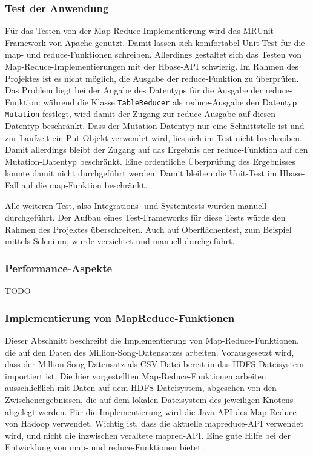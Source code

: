 \subsubsection{Test der Anwendung}
Für das Testen von der Map-Reduce-Implementierung wird das MRUnit-Framework von Apache
\cite{mrunit} genutzt. Damit lassen sich komfortabel Unit-Test für die map- und reduce-Funktionen
schreiben. Allerdings gestaltet sich das Testen von Map-Reduce-Implementierungen mit
der Hbase-API schwierig. Im Rahmen des Projektes ist es nicht möglich, die Ausgabe der
reduce-Funktion zu überprüfen. Das Problem liegt bei der Angabe des Datentyps für
die Ausgabe der reduce-Funktion: während die Klasse \texttt{TableReducer} als reduce-Ausgabe
den Datentyp \texttt{Mutation} festlegt, wird damit der Zugang zur reduce-Ausgabe auf diesen
Datentyp beschränkt. Dass der Mutation-Datentyp nur eine Schnittstelle ist und zur
Laufzeit ein Put-Objekt verwendet wird, lies sich im Test nicht beschreiben.
Damit allerdings bleibt der Zugang auf das Ergebnis der reduce-Funktion auf den
Mutation-Datentyp beschränkt. Eine ordentliche Überprüfung des Ergebnisses konnte damit
nicht durchgeführt werden. Damit bleiben die Unit-Test im Hbase-Fall auf die map-Funktion
beschränkt. 

Alle weiteren Test, also Integrations- und Systemtests wurden manuell durchgeführt.
Der Aufbau eines Test-Frameworks für diese Tests würde den Rahmen des Projektes 
überschreiten. Auch auf Oberflächentest, zum Beispiel mittels Selenium, wurde verzichtet
und manuell durchgeführt.

\subsubsection{Performance-Aspekte}
TODO


\subsubsection{Implementierung von MapReduce-Funktionen}

Dieser Abschnitt beschreibt die Implementierung von Map-Reduce-Funktionen, die auf den Daten
des Million-Song-Datensatzes arbeiten. Vorausgesetzt wird, dass der Million-Song-Datensatz als
CSV-Datei bereit in das HDFS-Dateisystem importiert ist. Die hier vorgestellten Map-Reduce-Funktionen
arbeiten ausschließlich mit Daten auf dem HDFS-Dateisystem, abgesehen von den Zwischenergebnissen,
die auf dem lokalen Dateisystem des jeweiligen Knotens abgelegt werden.
Für die Implementierung wird die Java-API des Map-Reduce von Hadoop verwendet. Wichtig ist,
dass die aktuelle mapreduce-API verwendet wird, und nicht die inzwischen veraltete mapred-API.
Eine gute Hilfe bei der Entwicklung von map- und reduce-Funktionen bietet \cite{miner2012mapreduce}.

